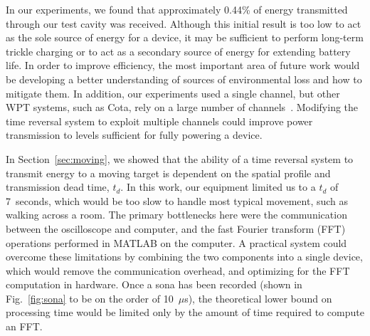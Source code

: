 In our experiments, we found that approximately 0.44\% of energy transmitted
through our test cavity was received.
%
Although this initial result is too low to act as the sole source of energy for
a device, it may be sufficient to perform long-term trickle charging or to act
as a secondary source of energy for extending battery life.
%
In order to improve efficiency, the most important area of future work would be
developing a better understanding of sources of environmental loss and how to
mitigate them.
%
In addition, our experiments used a single channel, but other WPT systems, such
as Cota, rely on a large number of channels~\cite{cota}.
%
Modifying the time reversal system to exploit multiple channels could improve
power transmission to levels sufficient for fully powering a device.



In Section~\ref{sec:moving}, we showed that the ability of a time reversal system
to transmit energy to a moving target is dependent on the spatial profile and
transmission dead time, $t_{d}$.
%
In this work, our equipment limited us to a $t_d$ of 7~seconds, which would be too slow
to handle most typical movement, such as walking across a room.
%
The primary bottlenecks here were the communication between the oscilloscope
and computer, and the fast Fourier transform (FFT) operations performed in MATLAB
on the computer.
%
A practical system could overcome these limitations by combining the two components
into a single device, which would remove the communication overhead, and optimizing for
the FFT computation in hardware.
%
Once a sona has been recorded (shown in Fig.~\ref{fig:sona} to be on the order of 10~$\mu$s),
the theoretical lower bound on processing time would be limited only by the amount of
time required to compute an FFT.

\newpage
